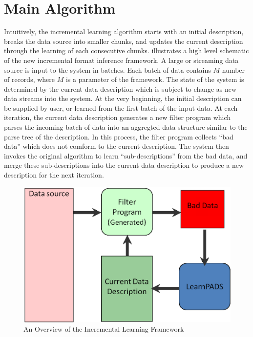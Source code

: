 \section{Main Algorithm}\label{sec:algo}

Intuitively, the incremental learning algorithm starts with an initial
description, breaks the data source into smaller chunks, and updates
the current description through the learning of each consecutive chunks. 
 illustrates a high level schematic of the new incremental
format inference framework. A large or streaming data source is input
to the system in batches. Each batch of data contains $M$ number of
records, where $M$ is a parameter of the framework.
The state of the system is determined
by the current data description which is subject to change as new data
streams into the system. At the very beginning, the initial description
can be supplied by user, or learned from the first batch of the input
data. At each iteration, the current data description
generates a new filter program which parses the incoming batch of data
into an aggregted data structure similar to the parse tree of the description.
In this process, the filter program collects ``bad data'' which does not
comform to the current description. The system then invokes the original
\learnpads{} algorithm to learn ``sub-descriptions'' from the bad data, and
merge these sub-descriptions into the current data description to produce
a new description for the next iteration. 

\begin{figure}[th]
\centering
\includegraphics[width=0.9\columnwidth]{overview}
\caption{An Overview of the Incremental Learning Framework}
\label{fig:overview}
\end{figure}

